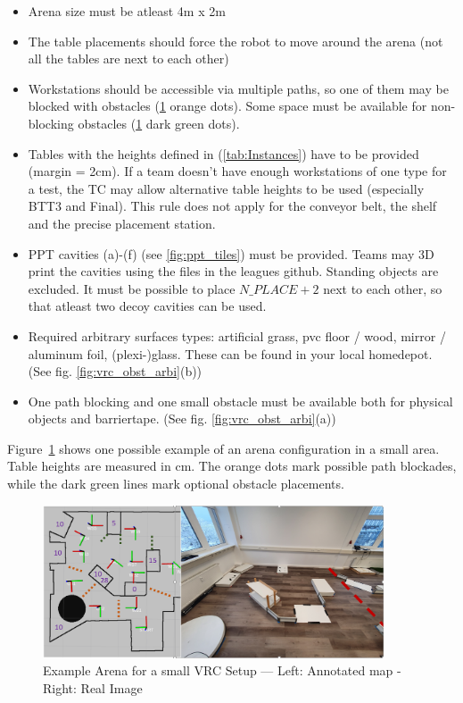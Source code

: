 \begin{itemize}
\item Arena size must be atleast 4m x 2m
\item The table placements should force the robot to move around the arena (not all the tables are next to each other)
\item Workstations should be accessible via multiple paths, so one of them may be blocked with obstacles (\ref{fig:vrc_arena_example} orange dots). Some space must be available for non-blocking obstacles (\ref{fig:vrc_arena_example} dark green dots).
\item Tables with the heights defined in (\ref{tab:Instances}) have to be provided (margin = 2cm). If a team doesn't have enough workstations of one type for a test, the TC may allow alternative table heights to be used (especially BTT3 and Final). This rule does not apply for the conveyor belt, the shelf and the precise placement station.
\item PPT cavities (a)-(f) (see \ref{fig:ppt_tiles}) must be provided. Teams may 3D print the cavities using the files in the leagues github. Standing objects are excluded. It must be possible to place ${N\_PLACE + 2}$ next to each other, so that atleast two decoy cavities can be used. 
\item Required arbitrary surfaces types: artificial grass, pvc floor / wood, mirror / aluminum foil, (plexi-)glass. 
These can be found in your local homedepot. (See fig. \ref{fig:vrc_obst_arbi}(b))
\item One path blocking and one small obstacle must be available both for physical objects and barriertape. (See fig. \ref{fig:vrc_obst_arbi}(a))
\end{itemize}

Figure~\ref{fig:vrc_arena_example} shows one possible example of an arena configuration in a small area.
Table heights are measured in cm. 
The orange dots mark possible path blockades, while the dark green lines mark optional obstacle placements. 


\begin{figure}[h!]
\centering
\includegraphics[width=0.9\textwidth ]{./images/vrc_arena_example.png}
\caption{Example Arena for a small VRC Setup --- Left: Annotated map - Right: Real Image }
\label{fig:vrc_arena_example}
\end{figure}

